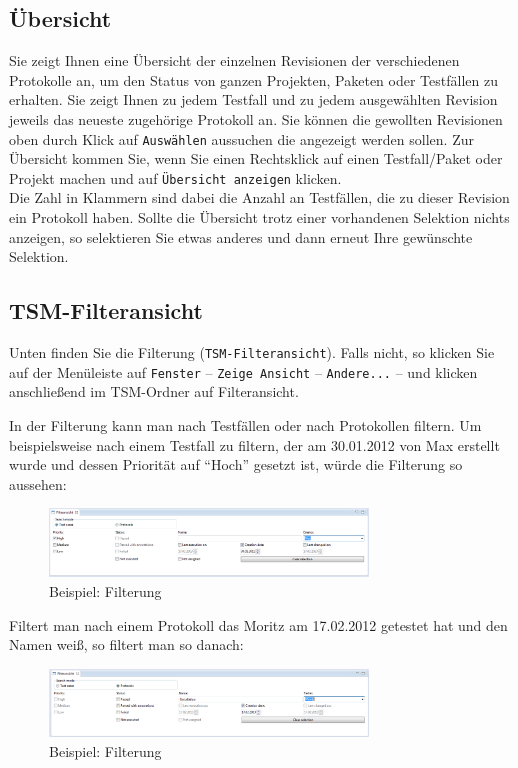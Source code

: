 \documentclass[11pt,a4paper,titlepage]{article}
\begin{document}
\subsection{Übersicht}
Sie zeigt Ihnen eine Übersicht der einzelnen Revisionen der verschiedenen Protokolle an, um den Status von ganzen Projekten, Paketen oder Testfällen zu erhalten.
Sie zeigt Ihnen zu jedem Testfall und zu jedem ausgewählten Revision jeweils das neueste zugehörige Protokoll an.
Sie können die gewollten Revisionen oben durch Klick auf \texttt{Auswählen} aussuchen die angezeigt werden sollen.
Zur Übersicht kommen Sie, wenn Sie einen Rechtsklick auf einen Testfall/Paket oder Projekt machen und auf \texttt{Übersicht anzeigen} klicken.\\
Die Zahl in Klammern sind dabei die Anzahl an Testfällen, die zu dieser Revision ein Protokoll haben.
Sollte die Übersicht trotz einer vorhandenen Selektion nichts anzeigen, so selektieren Sie etwas anderes und dann erneut Ihre gewünschte Selektion.


\subsection{TSM-Filteransicht}
Unten finden Sie die Filterung (\texttt{TSM-Filteransicht}).
Falls nicht, so klicken Sie auf der Menüleiste auf \texttt{Fenster} -- \texttt{Zeige Ansicht} -- \texttt{Andere...} -- und klicken anschließend im TSM-Ordner auf Filteransicht.

In der Filterung kann man nach Testfällen oder nach Protokollen filtern.
Um beispielsweise nach einem Testfall zu filtern, der am 30.01.2012 von Max erstellt wurde und dessen Priorität auf "`Hoch"' gesetzt ist, würde die Filterung so aussehen:

\begin{figure}[H]
\centering
\includegraphics[width= 320px]{BilderHandbuch/Filterung/FilterungA.png}
\caption{Beispiel: Filterung}
\label{fig:FilterungA}
\end{figure}

Filtert man nach einem Protokoll das Moritz am 17.02.2012 getestet hat und den Namen weiß, so filtert man so danach:

\begin{figure}[H]
\centering
\includegraphics[width= 320px]{BilderHandbuch/Filterung/FilterungB.png}
\caption{Beispiel: Filterung}
\label{fig:FilterungB}
\end{figure}
\end{document}
